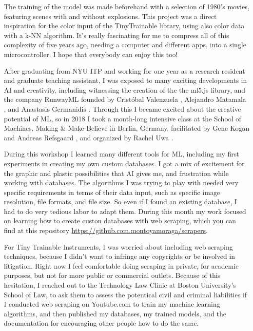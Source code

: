 The training of the model was made beforehand with a selection of 1980's movies, featuring scenes with and without explosions. This project was a direct inspiration for the color input of the TinyTrainable library, using also color data with a \acrshort{k-NN} algorithm. It's really fascinating for me to compress all of this complexity of five years ago, needing a computer and different apps, into a single microcontroller. I hope that everybody can enjoy this too!

After graduating from \acrshort{NYU} \acrshort{ITP} and working for one year as a research resident and graduate teaching assistant, I was exposed to many exciting developments in \acrshort{AI} and creativity, including witnessing the creation of the the ml5.js library, and the company RunwayML \cite{website-runwayml} founded by Cristóbal Valenzuela \cite{website-cristobal-valenzuela}, Alejandro Matamala \cite{website-alejandro-matamala}, and Anastasis Germanidis \cite{website-anastasis-germanidis}. Through this I became excited about the creative potential of \acrshort{ML}, so in 2018 I took a month-long intensive class at the School of Machines, Making \& Make-Believe \cite{website-school-of-machines} in Berlin, Germany, facilitated by Gene Kogan and Andreas Refsgaard \cite{website-andreas-refsgaard}, and organized by Rachel Uwa \cite{website-rachel-uwa}.

During this workshop I learned many different tools for \acrshort{ML}, including my first experiments in creating my own custom databases. I got a mix of excitement for the graphic and plastic possibilities that \acrshort{AI} gives me, and frustration while working with databases. The algorithms I was trying to play with needed very specific requirements in terms of their data input, such as specific image resolution, file formats,  and file size. So even if I found an existing database, I had to do very tedious labor to adapt them. During this month my work focused on learning how to create custon databases with web \gls{scraping}, which you can find at this repository \url{https://github.com.montoyamoraga/scrapers}.

For Tiny Trainable Instruments, I was worried about including web scraping techniques, because I didn't want to infringe any copyrights or be involved in litigation. Right now I feel comfortable doing scraping in private, for academic purposes, but not for more public or commercial outlets. Because of this hesitation, I reached out to the Technology Law Clinic \cite{website-boston-university-technology-law-clinic} at Boston University's School of Law, to ask them to assess the potentical civil and criminal liabilities if I conducted web scraping on Youtube.com to train my machine learning algorithms, and then published my databases, my trained models, and the documentation for encouraging other people how to do the same.





